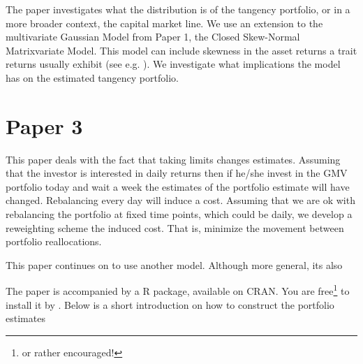 \documentclass[]{book}\usepackage{knitr}
\begin{document}
The paper investigates what the distribution is of the tangency portfolio, or in a more broader context, the capital market line. We use an extension to the multivariate Gaussian Model from Paper 1, the Closed Skew-Normal Matrixvariate Model. This model can include skewness in the asset returns a trait returns usually exhibit (see e.g. \cite{cont2001empirical}). We investigate what implications the model has on the estimated tangency portfolio.
\section*{Paper 3}
This paper deals with the fact that taking limits changes estimates. Assuming that the investor is interested in daily returns then if he/she invest in the GMV portfolio today and wait a week the estimates of the portfolio estimate will have changed.  Rebalancing every day will induce a cost. Assuming that we are ok with rebalancing the portfolio at fixed time points, which could be daily, we develop a reweighting scheme the induced cost. That is, minimize the movement between portfolio reallocations.

This paper continues on to use another model. Although more general, its also 

The paper is accompanied by a R package, available on CRAN. You are free\footnote{or rather encouraged!} to install it by \hlstd{(}\hlstd{)}. Below is a short introduction on how to construct the portfolio estimates  
\begin{knitrout}
\color{fgcolor}
\end{knitrout}
\end{document}
